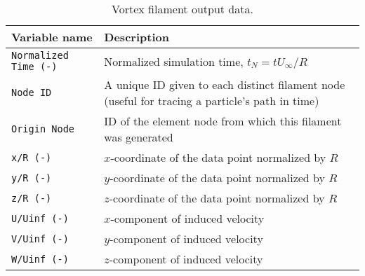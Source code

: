 \begin{table}
\centering
\caption{Vortex filament output data.}
\label{tbl:output_vortex_filaments}
\begin{tabular}{p{}p{}}
\toprule
Variable name & Description \\ \midrule
\texttt{Normalized Time (-)} & Normalized simulation time, $t_N=t U_\infty/R$ \\
\texttt{Node ID}             & A unique ID given to each distinct filament node (useful for tracing a particle's path in time) \\
\texttt{Origin Node}         & ID of the element node from which this filament was generated \\
\texttt{x/R (-)}             & $x$-coordinate of the data point normalized by $R$ \\
\texttt{y/R (-)}             & $y$-coordinate of the data point normalized by $R$ \\
\texttt{z/R (-)}             & $z$-coordinate of the data point normalized by $R$ \\
\texttt{U/Uinf (-)}          & $x$-component of induced velocity              \\
\texttt{V/Uinf (-)}          & $y$-component of induced velocity              \\
\texttt{W/Uinf (-)}          & $z$-component of induced velocity              \\
\bottomrule
\end{tabular}
\end{table}